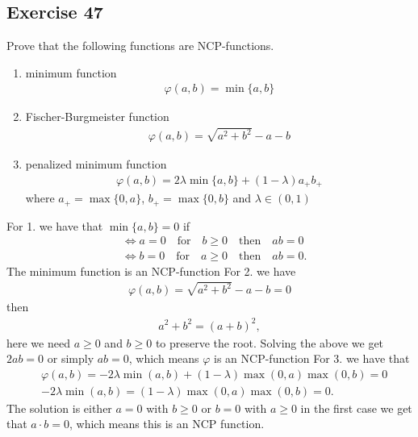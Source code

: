 \subsection{Exercise 47}
Prove that the following functions are NCP-functions.
\begin{enumerate}
    \item minimum function
        \begin{align}
            \varphi(a,b) = \min \{a, b\}
        \end{align}
    \item Fischer-Burgmeister function
        \begin{align}
            \varphi(a,b) = \sqrt{a^{2}+b^{2}} - a - b
        \end{align}
    \item penalized minimum function
        \begin{align}
            \varphi(a,b) = 2\lambda \min \{a, b\}  + (1-\lambda) a_+ b_+
        \end{align}
        where $a_+ = \max \{0, a\}$, $b_+ = \max \{0, b\} $ and $\lambda \in
        (0, 1)$
\end{enumerate}
For 1. we have that $\min \{a, b\}  =0$ if
\begin{align}
    &\Leftrightarrow a=0 \quad \text{for}\quad b\ge 0\quad \text{then}\quad
    ab =0\\
    &\Leftrightarrow b=0 \quad \text{for}\quad a\ge 0\quad \text{then}\quad
    ab =0.
\end{align}
The minimum function is an NCP-function
\newline
For 2. we have
\begin{align}
    \varphi(a,b) = \sqrt{a^{2}+b^{2}} - a -b =0
\end{align}
then
\begin{align}
    a^{2} + b^{2} = (a+b)^{2},
\end{align}
here we need $a\ge 0$ and $b\ge 0$ to preserve the root. Solving the above we
get $2ab =0$ or simply $ab =0$, which means $\varphi$ is an NCP-function
\newline
For 3. we have that
\begin{align}
    &\varphi(a,b) = -2\lambda \min (a,b) + (1-\lambda) \max(0, a) \max(0,b) = 0\\
    &-2\lambda \min (a,b) = (1-\lambda) \max(0, a) \max(0, b) = 0.
\end{align}
The solution is either $a = 0$ with $b \ge 0$ or $b=0$ with $a\ge 0$ in the
first case we get that $a\cdot b=0$, which means this is an NCP function.
